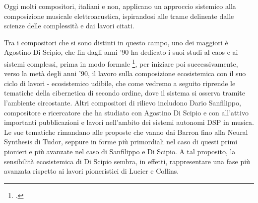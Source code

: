 Oggi molti compositori, italiani e non, 
applicano un approccio sistemico alla composizione musicale elettroacustica, 
ispirandosi alle trame delineate dalle scienze delle complessità e dai lavori citati. 

Tra i compositori che si sono distinti in questo campo, 
uno dei maggiori è Agostino Di Scipio, 
che fin dagli anni '90 ha dedicato i suoi studi al caos e ai sistemi complessi, 
prima in modo formale \footcite{discipioiterated}, per iniziare poi successivamente, 
verso la metà degli anni '90, il lavoro sulla composizione ecosistemica con il suo ciclo di lavori 
- ecosistemico udibile, che come vedremo a seguito riprende le tematiche della cibernetica di secondo ordine, 
dove il sistema si osserva tramite l'ambiente circostante.
Altri compositori di rilievo includono Dario Sanfilippo, 
compositore e ricercatore che ha studiato con Agostino Di Scipio e con all'attivo 
importanti pubblicazioni e lavori nell'ambito dei sistemi autonomi DSP in musica. 
Le sue tematiche rimandano alle proposte che vanno dai Barron fino alla Neural Synthesis di Tudor, 
seppure in forme più primordiali nel caso di questi primi pionieri e 
più avanzate nel caso di Sanfilippo e Di Scipio.
A tal proposito, la sensibilità ecosistemica di Di Scipio sembra, in effetti, 
rappresentare una fase più avanzata rispetto ai lavori pioneristici di Lucier e Collins. 

